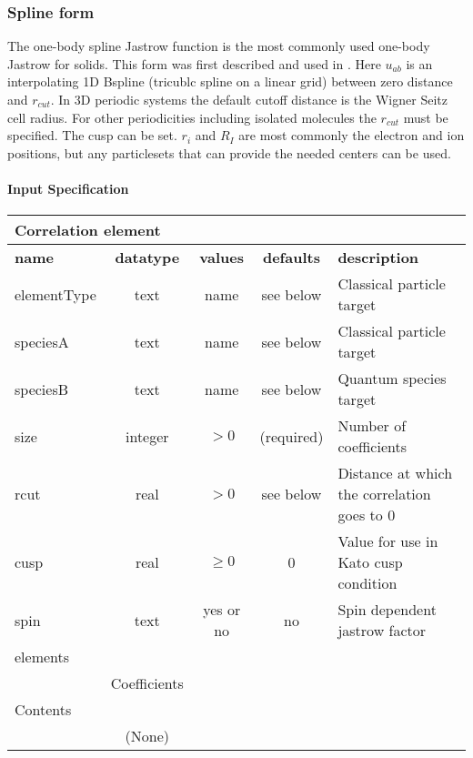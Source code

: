 \subsubsection{Spline form}
\label{sec:onebodyjastrowspline}

The one-body spline Jastrow function is the most commonly used one-body Jastrow for solids. This form 
was first described and used in \cite{EslerKimCeperleyShulenburger2012}.  
Here $u_{ab}$ is an interpolating 1D Bspline (tricublc spline on a linear grid) between zero distance and $r_{cut}$. In 3D periodic systems 
the default cutoff distance is the Wigner Seitz cell radius. For other periodicities including isolated 
molecules the $r_{cut}$ must be specified. The cusp can be set.   $r_i$ 
and $R_I$ are most commonly the electron and ion positions, but any particlesets that can provide the 
needed centers can be used.

\paragraph{Input Specification}
\begin{table}[h]
\begin{center}
\begin{tabular}{l c c c l }
\hline
\multicolumn{5}{l}{Correlation element} \\
\hline
\bfseries name & \bfseries datatype & \bfseries values & \bfseries defaults & \bfseries description \\
\hline
elementType & text & name & see below & Classical particle target  \\
speciesA & text & name & see below & Classical particle target \\
speciesB & text & name & see below & Quantum species target \\
size & integer & $> 0$ & (required) & Number of coefficients \\
rcut & real & $> 0$ & see below & Distance at which the correlation goes to 0 \\
cusp & real & $\ge 0$ & 0 & Value for use in Kato cusp condition \\
spin & text & yes or no & no & Spin dependent jastrow factor \\
\hline
\multicolumn{5}{l}{elements}\\ \hline
& Coefficients & & & \\ \hline
\multicolumn{5}{l}{Contents}\\ \hline
& (None)  & & &  \\ \hline
\end{tabular}
\end{center}
\end{table}

